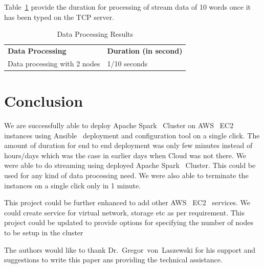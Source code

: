 Table~\ref{t:data-process-results-table} provide the duration for processing
of stream data of 10 words once it has been typed on the TCP server.

\begin{table}[htb]
	\centering
	\caption{Data Processing Results}\label{t:data-process-results-table}
	\begin{tabular}{ll} 
		\textbf{Data Processing} & \textbf{Duration (in second)} \\ 
		Data processing with 2 nodes  & 1/10 seconds \\
	\end{tabular}
\end{table}

\section{Conclusion}

We are successfully able to deploy Apache
Spark~\cite{hid-sp18-511-www-spark} Cluster on
AWS~\cite{hid-sp18-511-www-aws} EC2~\cite{hid-sp18-511-www-ec2}
instances using Ansible~\cite{hid-sp18-511-www-ansible} deployment and
configuration tool on a single click. The amount of duration for end
to end deployment was only few minutes instead of hours/days which was
the case in earlier days when Cloud was not there. We were able to do
streaming using deployed Apache Spark~\cite{hid-sp18-511-www-spark}
Cluster. This could be used for any kind of data processing need. We
were also able to terminate the instances on a single click only in 1
minute.

This project could be further enhanced to add other
AWS~\cite{hid-sp18-511-www-aws} EC2~\cite{hid-sp18-511-www-ec2}
services. We could create service for virtual network, storage etc as
per requirement. This project could be updated to provide options for
specifying the number of nodes to be setup in the cluster

\begin{acks}

  The authors would like to thank Dr.~Gregor~von~Laszewski for his
  support and suggestions to write this paper ans providing the
  technical assistance.

\end{acks}


 
